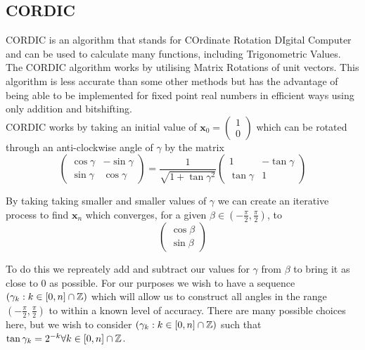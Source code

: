 {%
\subsection{CORDIC}
\label{SUB_"CORDIC"}

\theoremstyle{plain}
\newtheorem{Cordic Gamma Property}{Proposition}[subsection]
\newtheorem{Cordic Accuracy}[Cordic Gamma Property]{Proposition}

CORDIC is an algorithm that stands for COrdinate Rotation DIgital Computer and can be used to calculate many functions, including Trigonometric Values. The CORDIC algorithm works by utilising Matrix Rotations of unit vectors. This algorithm is less accurate than some other methods but has the advantage of being able to be implemented for fixed point real numbers in efficient ways using only addition and bitshifting.\\

CORDIC works by taking an initial value of
\begin{math}
	\mathbf{x}_0 = \left( 
		\begin{array}{c}
			1 \\
			0
		\end{array} \right)
\end{math}
which can be rotated through an anti-clockwise angle of $\gamma$ by the matrix
\begin{displaymath}
	\left( \begin{array}{cc}
		\cos{\gamma} & -\sin{\gamma} \\
		\sin{\gamma} &  \cos{\gamma}
	\end{array} \right)
	= \frac{1}{\sqrt{1 + \tan{\gamma}^2}} \left( \begin{array}{cc}
		1 & -\tan{\gamma} \\
		\tan{\gamma} & 1
	\end{array} \right)
\end{displaymath}

By taking taking smaller and smaller values of $\gamma$ we can create an iterative process to find $\mathbf{x}_n$ which converges, for a given $\beta \in (-\frac{\pi}{2}, \frac{\pi}{2})$, to
\begin{displaymath}
	\left( \begin{array}{c}
		\cos{\beta}\\
		\sin{\beta}
	\end{array} \right)
\end{displaymath}

To do this we repreately add and subtract our values for \(\gamma\) from \(\beta\) to bring it as close to 0 as possible. For our purposes we wish to have a sequence \((\gamma_k : k \in [0, n] \cap \mathbb{Z})\) which will allow us to construct all angles in the range \((-\frac{\pi}{2}, \frac{\pi}{2})\) to within a known level of accuracy. There are many possible choices here, but we wish to consider \((\gamma_k : k \in [0, n] \cap \mathbb{Z})\) such that \(\tan \gamma_k = 2^{-k} \forall k \in [0,n] \cap \mathbb{Z}\).\\

}
